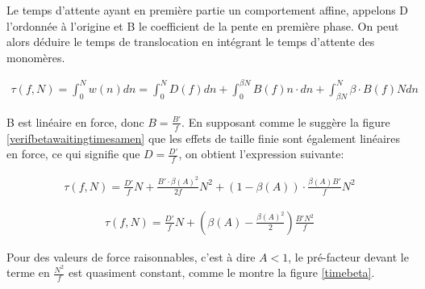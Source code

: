 Le temps d'attente ayant en première partie un comportement affine, appelons D l'ordonnée à l'origine et B le coefficient de la pente en première phase. On peut alors déduire le temps de translocation en intégrant le temps d'attente des monomères.


\begin{center}
\begin{eqnarray}
\tau(f,N) = \int_0^N w(n) dn = \int_0^N D(f) dn + \int_0^{\beta N} B(f) n \cdot dn + \int_{\beta N}^{N} \beta\cdot B(f) N dn  
\end{eqnarray}
\end{center}

 B est linéaire en force, donc $B=\frac{B'}{f}$. En supposant comme le suggère la figure \ref{verifbetawaitingtimesamen} que les effets de taille finie sont également linéaires en force, ce qui signifie que  $D=\frac{D'}{f}$, on obtient l'expression suivante:
 
\begin{center}
\begin{eqnarray}
\tau(f,N) = \frac{D'}{f} N + \frac{B' \cdot \beta(A)^2}{2f}N^2 +(1-\beta(A)) \cdot \frac{\beta(A) B'}{f}N^2
\end{eqnarray}
\end{center}
\begin{center}
\begin{eqnarray}
\boxed{\tau(f,N) = \frac{D'}{f} N + (\beta(A)-\frac{\beta(A)^2}{2}) \frac{B'N^2}{f}}
\label{tauformula}
\end{eqnarray}
\end{center}

 Pour des valeurs de force raisonnables, c'est à dire $A<1$, le pré-facteur devant le terme en $\frac{N^2}{f}$ est quasiment constant, comme le montre la figure \ref{timebeta}. 


